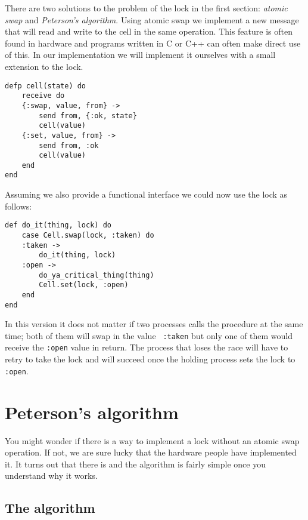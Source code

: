 \documentclass[a4paper,11pt]{article}
\begin{document}
There are two solutions to the problem of the lock in the first
section: {\em atomic swap} and {\em Peterson's algorithm}. Using atomic
swap we implement a new message that will read and write to the cell
in the same operation. This feature is often found in hardware and
programs written in C or C++ can often make direct use of this. In our
implementation we will implement it ourselves with a small extension to the lock. 

\begin{verbatim}
defp cell(state) do
    receive do
    {:swap, value, from} ->
        send from, {:ok, state}
        cell(value)
    {:set, value, from} ->
        send from, :ok
        cell(value)
    end
end
\end{verbatim}

Assuming we also provide a functional interface we could now use the lock as follows:

\pagebreak

\begin{verbatim}
def do_it(thing, lock) do
    case Cell.swap(lock, :taken) do
    :taken -> 
        do_it(thing, lock)
    :open ->
        do_ya_critical_thing(thing)
        Cell.set(lock, :open)
    end
end
\end{verbatim}

In this version it does not matter if two processes calls the
procedure at the same time; both of them will swap in the value {\tt
    :taken} but only one of them would receive the {\tt :open} value in
return. The process that loses the race will have to retry to take
the lock and will succeed once the holding process sets the lock to
{\tt :open}.



\section{Peterson's algorithm}

You might wonder if there is a way to implement a lock without an
atomic swap operation. If not, we are sure lucky that the hardware
people have implemented it. It turns out that there is and the
algorithm is fairly simple once you understand why it works.


\subsection{The algorithm}
\end{document}
